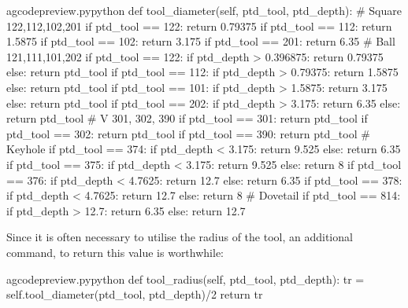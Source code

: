 \documentclass{ltxdoc}
\begin{document}
\lstset{firstnumber=\thegcpy}
\begin{writecode}{a}{gcodepreview.py}{python}
    def tool_diameter(self, ptd_tool, ptd_depth):
# Square 122,112,102,201
        if ptd_tool == 122:
            return 0.79375
        if ptd_tool == 112:
            return 1.5875
        if ptd_tool == 102:
            return 3.175
        if ptd_tool == 201:
            return 6.35
# Ball 121,111,101,202
        if ptd_tool == 122:
            if ptd_depth > 0.396875:
                return 0.79375
            else:
                return ptd_tool
        if ptd_tool == 112:
            if ptd_depth > 0.79375:
                return 1.5875
            else:
                return ptd_tool
        if ptd_tool == 101:
            if ptd_depth > 1.5875:
                return 3.175
            else:
                return ptd_tool
        if ptd_tool == 202:
            if ptd_depth > 3.175:
                return 6.35
            else:
                return ptd_tool
# V 301, 302, 390
        if ptd_tool == 301:
            return ptd_tool
        if ptd_tool == 302:
            return ptd_tool
        if ptd_tool == 390:
            return ptd_tool
# Keyhole
        if ptd_tool == 374:
            if ptd_depth < 3.175:
                return 9.525
            else:
                return 6.35
        if ptd_tool == 375:
            if ptd_depth < 3.175:
                return 9.525
            else:
                return 8
        if ptd_tool == 376:
            if ptd_depth < 4.7625:
                return 12.7
            else:
                return 6.35
        if ptd_tool == 378:
            if ptd_depth < 4.7625:
                return 12.7
            else:
                return 8
# Dovetail
        if ptd_tool == 814:
            if ptd_depth > 12.7:
                return 6.35
            else:
                return 12.7

\end{writecode}
\addtocounter{gcpy}{66}

Since it is often necessary to utilise the radius of the tool, an additional command,  to return this value is worthwhile:
 
\lstset{firstnumber=\thegcpy}
\begin{writecode}{a}{gcodepreview.py}{python}
    def tool_radius(self, ptd_tool, ptd_depth):
        tr = self.tool_diameter(ptd_tool, ptd_depth)/2
        return tr

\end{writecode}
\addtocounter{gcpy}{4}
 
\end{document}
